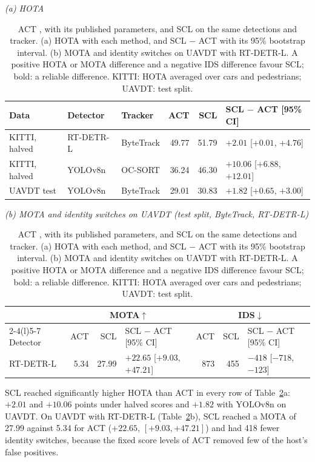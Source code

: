\documentclass[pdflatex,sn-mathphys-num,iicol]{sn-jnl}
\newcommand{\scl}{SCL}
\begin{document}
\begin{table}[!tp]
\caption{ACT \cite{act2026adaptive}, with its published parameters, and \scl{} on the same detections and tracker. (a) HOTA with each method, and \scl{} $-$ ACT with its 95\% bootstrap interval. (b) MOTA and identity switches on UAVDT with RT-DETR-L. A positive HOTA or MOTA difference and a negative IDS difference favour \scl{}; bold: a reliable difference. KITTI: HOTA averaged over cars and pedestrians; UAVDT: test split.}
\label{tab:act}
\centering\footnotesize
\setlength{\tabcolsep}{3pt}
{\textit{(a) HOTA}}\par\smallskip
\begin{tabular}{@{}lllrrl@{}}
\toprule
Data & Detector & Tracker & ACT & \scl{} & \scl{} $-$ ACT [95\% CI]\\
\midrule
KITTI, halved & RT-DETR-L & ByteTrack & 49.77 & 51.79 & {\boldmath $+2.01$ [$+0.01$, $+4.76$]}\\
KITTI, halved & YOLOv8n & OC-SORT & 36.24 & 46.30 & {\boldmath $+10.06$ [$+6.88$, $+12.01$]}\\
\addlinespace[2pt]
UAVDT test & YOLOv8n & ByteTrack & 29.01 & 30.83 & {\boldmath $+1.82$ [$+0.65$, $+3.00$]}\\
\bottomrule
\end{tabular}

\medskip
{\textit{(b) MOTA and identity switches on UAVDT (test split, ByteTrack, RT-DETR-L)}}\par\smallskip
\begin{tabular}{@{}lrrlrrl@{}}
\toprule
 & \multicolumn{3}{c}{MOTA$\uparrow$} & \multicolumn{3}{c}{IDS$\downarrow$}\\
\cmidrule(lr){2-4}\cmidrule(l){5-7}
Detector & ACT & \scl{} & \scl{} $-$ ACT [95\% CI] & ACT & \scl{} & \scl{} $-$ ACT [95\% CI]\\
\midrule
RT-DETR-L & 5.34 & 27.99 & {\boldmath $+22.65$ [$+9.03$, $+47.21$]} & 873 & 455 & {\boldmath $-418$ [$-718$, $-123$]}\\
\bottomrule
\end{tabular}
\end{table}

\scl{} reached
significantly higher HOTA than ACT in every row of Table~\ref{tab:act}a: $+2.01$ and $+10.06$ points
under halved scores and $+1.82$ with YOLOv8n on UAVDT. On UAVDT with RT-DETR-L
(Table~\ref{tab:act}b), \scl{} reached a MOTA of 27.99 against 5.34 for ACT ($+22.65$,
$[+9.03,+47.21]$) and had 418 fewer identity switches, because the fixed score levels of ACT
removed few of the host's false positives.
\end{document}
